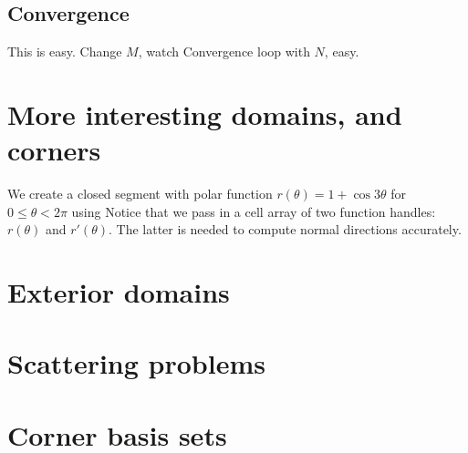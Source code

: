 \documentclass[11pt]{article}
\begin{document}
\subsection{Convergence}

This is easy.
Change $M$, watch 
Convergence loop with $N$, easy.


\section{More interesting domains, and corners}

We create a closed segment with polar function $r(\theta) = 1 + \cos 3\theta$
for $0\le \theta<2\pi$ using
Notice that we pass in a cell array of two function handles:
$r(\theta)$ and $r'(\theta)$. The latter is needed to compute normal
directions accurately.




\section{Exterior domains}

\section{Scattering problems}

\section{Corner basis sets}




 

\end{document}
